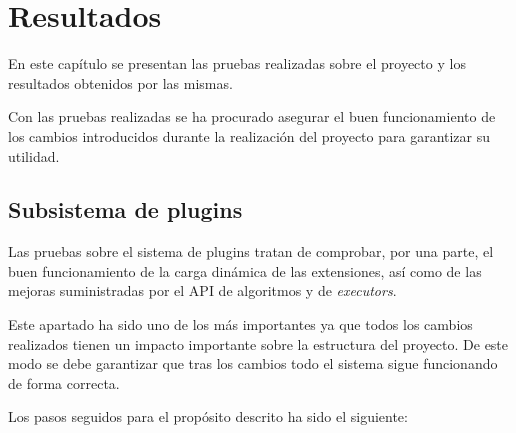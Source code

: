 \chapter{Resultados}

En este capítulo se presentan las pruebas realizadas sobre el proyecto y los resultados obtenidos por las mismas.

Con las pruebas realizadas se ha procurado asegurar el buen funcionamiento de los cambios introducidos durante la realización del proyecto para garantizar su utilidad.

\section{Subsistema de plugins}

Las pruebas sobre el sistema de plugins tratan de comprobar, por una parte, el buen funcionamiento de la carga dinámica de las extensiones, así como de las mejoras suministradas por el API de algoritmos y de \emph{executors}.

Este apartado ha sido uno de los más importantes ya que todos los cambios realizados tienen un impacto importante sobre la estructura del proyecto. De este modo se debe garantizar que tras los cambios todo el sistema sigue funcionando de forma correcta.

Los pasos seguidos para el propósito descrito ha sido el siguiente:

